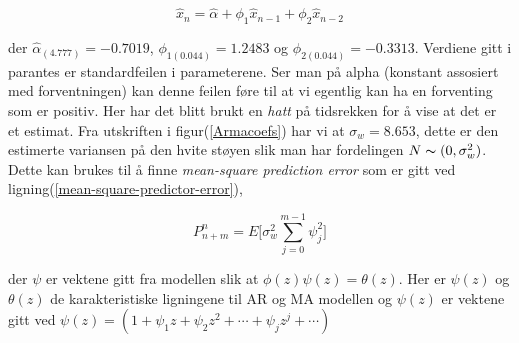 \begin{equation}
\hat{x}_{n} = \hat{\alpha} + \phi_{1}\hat{x}_{n-1} + \phi_{2}\hat{x}_{n-2}
\label{predictoreq}
\end{equation}

der $\hat{\alpha}_{(4.777)} = -0.7019$, $\phi_{1(0.044)} = 1.2483$ og $\phi_{2(0.044)} = -0.3313$. Verdiene gitt i parantes er standardfeilen i parameterene. Ser man på alpha (konstant assosiert med forventningen) kan denne feilen føre til at vi egentlig kan ha en forventing som er positiv.
Her har det blitt brukt en \emph{hatt} på tidsrekken for å vise at det er et estimat. Fra utskriften i figur(\ref{Armacoefs}) har vi at $\sigma_{w} = 8.653$, dette er den estimerte variansen på den hvite støyen slik man har fordelingen $N \thicksim (0, \sigma_{w}^{2})$. Dette kan brukes til å finne \emph{mean-square prediction error} som er gitt ved ligning(\ref{mean-square-predictor-error}),

\begin{equation}
    P^{n}_{n + m} = E\bigg[\sigma_{w}^{2}\sum_{j = 0}^{m-1}\psi_{j}^{2}\bigg]
    \label{mean-square-predictor-error}
\end{equation}

der $\psi$ er vektene gitt fra modellen slik at $\phi(z)\psi(z) = \theta(z)$. Her er $\psi(z)$ og $\theta(z)$ de karakteristiske ligningene til AR og MA modellen og $\psi(z)$ er vektene gitt ved $\psi(z) = (1 + \psi_{1}z + \psi_{2}z^2 + \cdots + \psi_{j}z^{j}+\cdots)$

